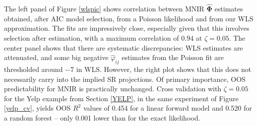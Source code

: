 \documentclass[12pt]{article}
\newcommand{\bs}[1]{\boldsymbol{#1}}
\begin{document}
The left panel of Figure \ref{wlspic} shows correlation  between  MNIR
$\bs{\hat\Phi}$ estimates obtained, after AIC model selection,  from a Poisson
likelihood and from our WLS approximation.  The fits are impressively close,
especially given that this involves  selection after estimation, with a
maximum correlation of $0.94$ at $\zeta=0.05$.  The center panel shows that
there are systematic discrepancies:  WLS estimates are attenuated,
and some big negative $\hat\varphi_{ij}$ estimates from the Poisson fit are
thresholded around $-7$ in WLS.  However, the right plot shows that this does
not necessarily carry into the implied SR projections. Of primary importance,
OOS predictability for MNIR is practically unchanged.  Cross validation with
$\zeta=0.05$ for the Yelp example from Section \ref{YELP}, in the same
experiment of Figure \ref{yelp_cv}, yields OOS $R^2$  values of
0.454 for a linear forward model and 0.520 for a random forest -- only 0.001
lower than for the exact likelihood.
\end{document}
